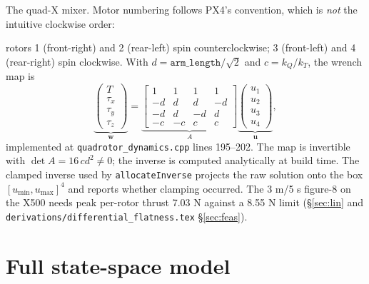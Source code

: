 \documentclass[11pt]{article}
\begin{document}
The quad-X mixer. Motor numbering follows PX4's convention, which is \emph{not} the intuitive
clockwise order:
\begin{center}
\end{center}
\quad rotors 1 (front-right) and 2 (rear-left) spin counterclockwise; 3 (front-left) and 4
(rear-right) spin clockwise. With $d = \texttt{arm\_length}/\sqrt2$ and
$c = k_Q/k_T$, the wrench map is
\begin{equation}
  \underbrace{\begin{pmatrix} T \\ \tau_x \\ \tau_y \\ \tau_z \end{pmatrix}}_{\bm w}
  = \underbrace{\begin{bmatrix}
      1 & 1 & 1 & 1 \\
    -d & d & d & -d \\
    -d & d & -d & d \\
    -c & -c & c & c
  \end{bmatrix}}_{A}
  \underbrace{\begin{pmatrix} u_1 \\ u_2 \\ u_3 \\ u_4 \end{pmatrix}}_{\bm u},
  \label{eq:alloc}
\end{equation}
implemented at \texttt{quadrotor\_dynamics.cpp} lines 195--202. The map is invertible with
$\det A = 16\, c d^2 \neq 0$; the inverse is computed analytically at build time. The
clamped inverse used by \texttt{allocateInverse} projects the raw solution onto the box
$[u_{\min}, u_{\max}]^4$ and reports whether clamping occurred. The 3 m/5 s figure-8 on the
X500 needs peak per-rotor thrust 7.03 N against a 8.55 N limit (\S\ref{sec:lin} and
\texttt{derivations/differential\_flatness.tex} \S\ref{sec:feas}).

\section{Full state-space model}
\end{document}
